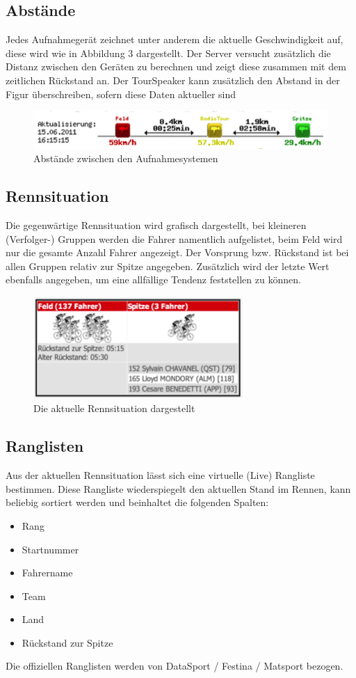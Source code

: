 \subsection{Abstände}
Jedes Aufnahmegerät zeichnet unter anderem die aktuelle Geschwindigkeit auf, diese wird wie in Abbildung 3 dargestellt. Der Server versucht zusätzlich die Distanz zwischen den Geräten zu berechnen und zeigt diese zusammen mit dem zeitlichen Rückstand an. Der TourSpeaker kann zusätzlich den Abstand in der Figur überschreiben, sofern diese Daten aktueller sind
\begin{figure}[H]
	\centering
	\includegraphics[width=130mm]{images/tourliveweb/abstaende.png}
	\caption{Abstände zwischen den Aufnahmesystemen}
\end{figure}

\subsection{Rennsituation}
Die gegenwärtige Rennsituation wird grafisch dargestellt, bei kleineren (Verfolger-) Gruppen werden die Fahrer namentlich aufgelistet, beim Feld wird nur die gesamte Anzahl Fahrer angezeigt. Der Vorsprung bzw. Rückstand ist bei allen Gruppen relativ zur Spitze angegeben. Zusätzlich wird der letzte Wert ebenfalls angegeben, um eine allfällige Tendenz feststellen zu können.
\begin{figure}[H]
	\centering
	\includegraphics[width=80mm]{images/tourliveweb/rennsituation.png}
	\caption{Die aktuelle Rennsituation dargestellt}
\end{figure}
\subsection{Ranglisten}
Aus der aktuellen Rennsituation lässt sich eine virtuelle (Live) Rangliste bestimmen. Diese Rangliste wiederspiegelt den aktuellen Stand im Rennen, kann beliebig sortiert werden und beinhaltet die folgenden Spalten:
\begin{itemize}
\item Rang
\item Startnummer
\item Fahrername
\item Team
\item Land
\item Rückstand zur Spitze
\end{itemize}
Die offiziellen Ranglisten werden von DataSport / Festina / Matsport bezogen.
